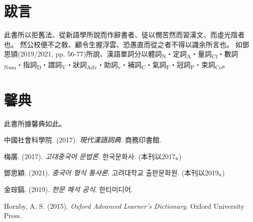 \chapter*{跋言}
此書所以拒舊法、從新語學所說而作辭書者、徒以憫苦然而習漢文、而虛光陰者也。
然公校便不之敎、顧令生握浮雲、恐愚直而從之者不得以識余所言也。
如鄧思頴(2019/2021, pp. 56-77)所說、漢語單詞分以體詞\textsubscript{N}・定詞\textsubscript{A}・量詞\textsubscript{Cl}・數詞\textsubscript{Num}・指詞\textsubscript{D}・謂詞\textsubscript{V}・狀詞\textsubscript{Adv}・助詞\textsubscript{v}・補詞\textsubscript{C}・氣詞\textsubscript{F}・冠詞\textsubscript{P}・束詞\textsubscript{Co}。
\chapter*{馨典}
此書所據馨典如此。
\par 中國社會科學院. (2017). \textit{現代漢語詞典}. 商務印書館.
\par 梅廣. (2017). \textit{고대중국어 문법론}. 한국문화사. (本刊以2017。)
\par 鄧思穎. (2021). \textit{중국어 형식 통사론}. 고려대학교 출판문화원. (本刊以2019。)
\par 金琮鎬. (2019). \textit{한문 해석 공식}. 한티미디어.
\par Hornby, A. S. (2015). \textit{Oxford Advanced Learner's Dictionary}. Oxford University Press.
